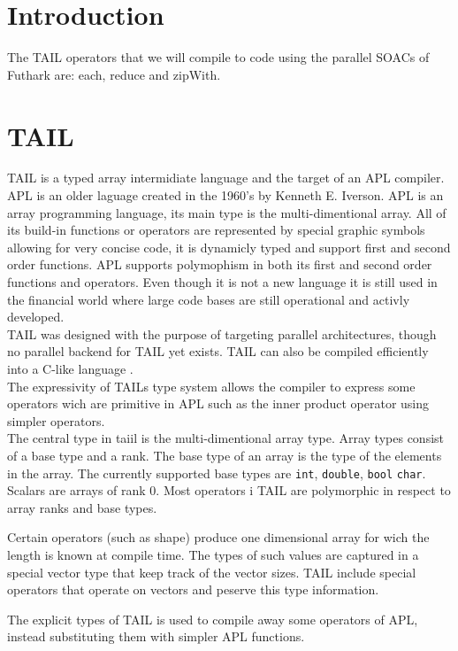 \documentclass[11pt]{article}
\begin{document}
\section{Introduction}
The TAIL operators that we will compile to code using the parallel SOACs of Futhark are: each, reduce and zipWith.

\section{TAIL}
TAIL is a typed array intermidiate language and the target of an APL compiler. APL is an older laguage created in the 1960's by Kenneth E. Iverson. APL is an array programming language, its main type is the multi-dimentional array. All of its build-in functions or operators are represented by special graphic symbols allowing for very concise code, it is dynamicly typed and support  first and second order functions. APL supports polymophism in both its first and second order functions and operators. Even though it is not a new language it is still used in the financial world where large code bases are still operational and activly developed. \\

TAIL was designed with the purpose of targeting parallel architectures, though no parallel backend for TAIL yet exists. TAIL can also be compiled efficiently into a C-like language \cite{Elsman0}. \\

The expressivity of TAILs type system allows the compiler to express some operators wich are primitive in APL such as the inner product operator using simpler operators. \\

The central type in taiil is the multi-dimentional array type. Array types consist of a base type and a rank. The base type of an array is the type of the elements in the array.  The currently supported base types are {\tt int}, {\tt double}, {\tt bool} {\tt char}. Scalars are arrays of rank 0. Most operators i TAIL are polymorphic in respect to array ranks and base types. 

Certain operators (such as shape) produce one dimensional array for wich the length is known at compile time. The types of such values are captured in a special vector type that keep track of the vector sizes. 
TAIL include special operators that operate on vectors and peserve this type information. 

The explicit types of TAIL is used to compile away some operators of APL, instead substituting them with simpler APL functions. \\
\end{document}
